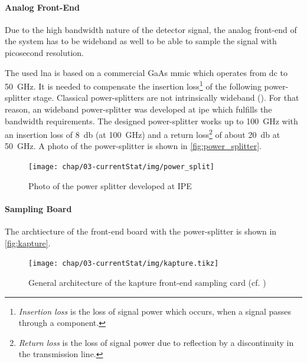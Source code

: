 \paragraph{Analog Front-End}
Due to the high bandwidth nature of the detector signal, the analog front-end of the system has to be wideband as well to be able to sample the signal with picosecond resolution. 

The used \gls{lna} is based on a commercial GaAs \gls{mmic} which operates from \gls{dc} to \SI{50}{\giga \hertz}. 
It is needed to compensate the insertion loss\footnote{\textit{Insertion loss} is the loss of signal power which occurs, when a signal passes through a component.} of the following power-splitter stage. 
Classical power-splitters are not intrinsically wideband (\cite{caselle2014}). 
For that reason, an wideband power-splitter was developed at \gls{ipe} which fulfills the bandwidth requirements. 
The designed power-splitter works up to \SI{100}{\giga \hertz} with an insertion loss of \SI{8}{\decibel} (at \SI{100}{\GHz}) and a return loss\footnote{\textit{Return loss} is the loss of signal power due to reflection by a discontinuity in the transmission line.} of about \SI{20}{\decibel} at \SI{50}{\giga \hertz}. \cite{caselle2014}
A photo of the power-splitter is shown in \autoref{fig:power_splitter}.

\begin{figure}[tbh]
	\centering
	\texttt{[image: chap/03-currentStat/img/power\_split]}
	\caption{Photo of the power splitter developed at IPE}
	\label{fig:power_splitter}
\end{figure}

\paragraph{Sampling Board}
The archtiecture of the front-end board with the power-splitter is shown in \autoref{fig:kapture}. 
\begin{figure}[tbh]
	\centering
	\texttt{[image: chap/03-currentStat/img/kapture.tikz]}
	\caption[General architecture of the KAPTURE system]{General architecture of the \Gls{kapture} front-end sampling card (cf. \cite[p.2]{caselleKAP})}
	\label{fig:kapture}
\end{figure}

